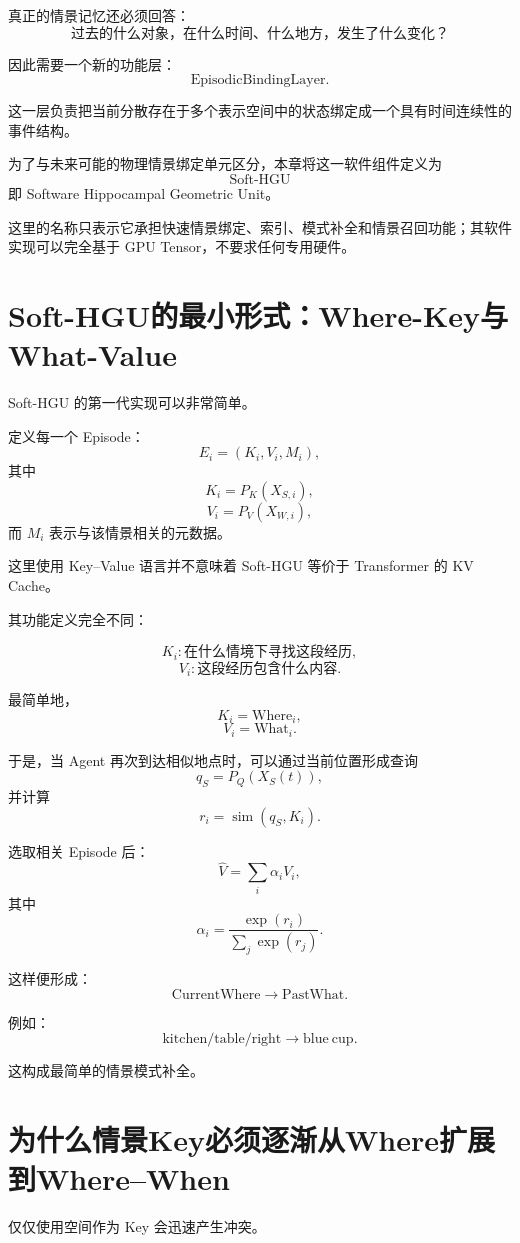 真正的情景记忆还必须回答：
\[
\boxed{
\text{过去的什么对象，在什么时间、什么地方，发生了什么变化？}
}
\]

因此需要一个新的功能层：
\[
\boxed{
\mathrm{EpisodicBindingLayer}.
}
\]

这一层负责把当前分散存在于多个表示空间中的状态绑定成一个具有时间连续性的事件结构。

为了与未来可能的物理情景绑定单元区分，本章将这一软件组件定义为
\[
\boxed{
\mathrm{Soft\text{-}HGU}
}
\]
即 Software Hippocampal Geometric Unit。

这里的名称只表示它承担快速情景绑定、索引、模式补全和情景召回功能；其软件实现可以完全基于 GPU Tensor，不要求任何专用硬件。

\section{Soft-HGU的最小形式：Where-Key与What-Value}

Soft-HGU 的第一代实现可以非常简单。

定义每一个 Episode：
\[
E_i
=
(K_i,V_i,M_i),
\]
其中
\[
K_i
=
P_K(X_{S,i}),
\]
\[
V_i
=
P_V(X_{W,i}),
\]
而 $M_i$ 表示与该情景相关的元数据。

这里使用 Key--Value 语言并不意味着 Soft-HGU 等价于 Transformer 的 KV Cache。

其功能定义完全不同：

\[
\boxed{
K_i:
\text{在什么情境下寻找这段经历},
}
\]
\[
\boxed{
V_i:
\text{这段经历包含什么内容}.
}
\]

最简单地，
\[
K_i=\mathrm{Where}_i,
\]
\[
V_i=\mathrm{What}_i.
\]

于是，当 Agent 再次到达相似地点时，可以通过当前位置形成查询
\[
q_S=P_Q(X_S(t)),
\]
并计算
\[
r_i
=
\operatorname{sim}(q_S,K_i).
\]

选取相关 Episode 后：
\[
\hat V
=
\sum_i
\alpha_i V_i,
\]
其中
\[
\alpha_i
=
\frac{\exp(r_i)}
{\sum_j\exp(r_j)}.
\]

这样便形成：
\[
\boxed{
\mathrm{CurrentWhere}
\rightarrow
\mathrm{PastWhat}.
}
\]

例如：
\[
\mathrm{kitchen/table/right}
\rightarrow
\mathrm{blue\ cup}.
\]

这构成最简单的情景模式补全。

\section{为什么情景Key必须逐渐从Where扩展到Where--When}

仅仅使用空间作为 Key 会迅速产生冲突。

